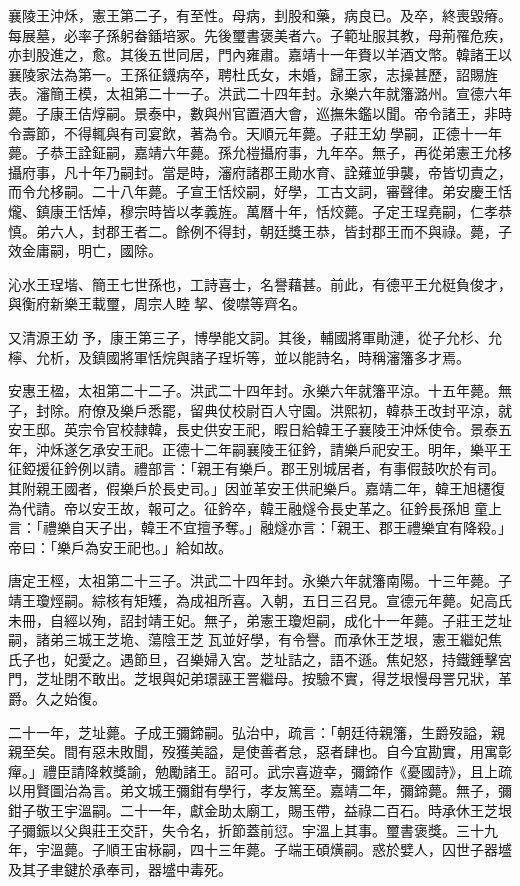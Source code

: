 襄陵王沖秌，憲王第二子，有至性。母病，刲股和藥，病良已。及卒，終喪毀瘠。每展墓，必率子孫躬畚鍤培冢。先後璽書褒美者六。子範址服其教，母荊罹危疾，亦刲股進之，愈。其後五世同居，門內雍肅。嘉靖十一年賚以羊酒文幣。韓諸王以襄陵家法為第一。王孫征鑖病卒，聘杜氏女，未婚，歸王家，志操甚歷，詔賜旌表。瀋簡王模，太祖第二十一子。洪武二十四年封。永樂六年就籓潞州。宣德六年薨。子康王佶焞嗣。景泰中，數與州官置酒大會，巡撫朱鑑以聞。帝令諸王，非時令壽節，不得輒與有司宴飲，著為令。天順元年薨。子莊王幼學嗣，正德十一年薨。子恭王詮鉦嗣，嘉靖六年薨。孫允榿攝府事，九年卒。無子，再從弟憲王允栘攝府事，凡十年乃嗣封。當是時，瀋府諸郡王勛水育、詮薙並爭襲，帝皆切責之，而令允栘嗣。二十八年薨。子宣王恬烄嗣，好學，工古文詞，審聲律。弟安慶王恬爖、鎮康王恬焯，穆宗時皆以孝義旌。萬曆十年，恬烄薨。子定王珵堯嗣，仁孝恭慎。弟六人，封郡王者二。餘例不得封，朝廷獎王恭，皆封郡王而不與祿。薨，子效金庸嗣，明亡，國除。

沁水王珵堦、簡王七世孫也，工詩喜士，名譽藉甚。前此，有德平王允梃負俊才，與衡府新樂王載璽，周宗人睦挈、俊噤等齊名。

又清源王幼予，康王第三子，博學能文詞。其後，輔國將軍勛漣，從子允杉、允檸、允析，及鎮國將軍恬烷與諸子珵圻等，並以能詩名，時稱瀋籓多才焉。

安惠王楹，太祖第二十二子。洪武二十四年封。永樂六年就籓平涼。十五年薨。無子，封除。府僚及樂戶悉罷，留典仗校尉百人守園。洪熙初，韓恭王改封平涼，就安王邸。英宗令官校隸韓，長史供安王祀，暇日給韓王子襄陵王沖秌使令。景泰五年，沖秌遂乞承安王祀。正德十二年嗣襄陵王征鈐，請樂戶祀安王。明年，樂平王征錏援征鈐例以請。禮部言：「親王有樂戶。郡王別城居者，有事假鼓吹於有司。其附親王國者，假樂戶於長史司。」因並革安王供祀樂戶。嘉靖二年，韓王旭櫏復為代請。帝以安王故，報可之。征鈐卒，韓王融燧令長史革之。征鈐長孫旭童上言：「禮樂自天子出，韓王不宜擅予奪。」融燧亦言：「親王、郡王禮樂宜有降殺。」帝曰：「樂戶為安王祀也。」給如故。

唐定王桱，太祖第二十三子。洪武二十四年封。永樂六年就籓南陽。十三年薨。子靖王瓊烴嗣。綜核有矩矱，為成祖所喜。入朝，五日三召見。宣德元年薨。妃高氏未冊，自經以殉，詔封靖王妃。無子，弟憲王瓊炟嗣，成化十一年薨。子莊王芝址嗣，諸弟三城王芝垝、蕩陰王芝瓦並好學，有令譽。而承休王芝垠，憲王繼妃焦氏子也，妃愛之。遇節旦，召樂婦入宮。芝址詰之，語不遜。焦妃怒，持鐵錘擊宮門，芝址閉不敢出。芝垠與妃弟璟誣王詈繼母。按驗不實，得芝垠慢母詈兄狀，革爵。久之始復。

二十一年，芝址薨。子成王彌鍗嗣。弘治中，疏言：「朝廷待親籓，生爵歿謚，親親至矣。間有惡未敗聞，歿獲美謚，是使善者怠，惡者肆也。自今宜勘實，用寓彰癉。」禮臣請降敕獎諭，勉勵諸王。詔可。武宗喜遊幸，彌鍗作《憂國詩》，且上疏以用賢圖治為言。弟文城王彌鉗有學行，孝友篤至。嘉靖二年，彌鍗薨。無子，彌鉗子敬王宇溫嗣。二十一年，獻金助太廟工，賜玉帶，益祿二百石。時承休王芝垠子彌鋠以父與莊王交訐，失令名，折節蓋前愆。宇溫上其事。璽書褒獎。三十九年，宇溫薨。子順王宙栐嗣，四十三年薨。子端王碩熿嗣。惑於嬖人，囚世子器墭及其子聿鍵於承奉司，器墭中毒死。

